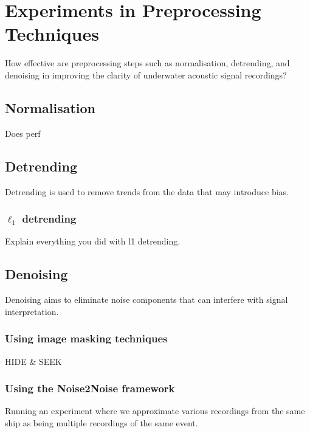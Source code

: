 \chapter{Experiments in Preprocessing Techniques}


\begin{researchquestion}
How effective are preprocessing steps such as normalisation, detrending, and denoising in improving the clarity of underwater acoustic signal recordings?
\end{researchquestion}

\section{Normalisation}

Does perf

\section{Detrending}

Detrending is used to remove trends from the data that may introduce bias.

\subsection{\texorpdfstring{$\ell_1$}{l1} detrending}

Explain everything you did with l1 detrending.

\section{Denoising}

Denoising aims to eliminate noise components that can interfere with signal interpretation.

\subsection{Using image masking techniques}

HIDE \& SEEK

\subsection{Using the Noise2Noise framework}

Running an experiment where we approximate various recordings from the same ship as being multiple recordings of the same event.
